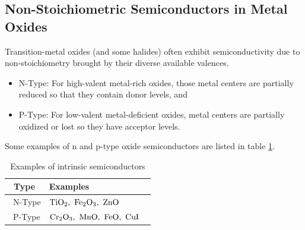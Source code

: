 \subsection{Non-Stoichiometric Semiconductors in Metal Oxides}
%
Transition-metal oxides (and some halides) often exhibit semiconductivity 
due to non-stoichiometry brought by their diverse available valences.
%
\begin{itemize}
    \item N-Type: For high-valent metal-rich oxides, those metal centers are partially reduced so that they contain donor levels, and
    \item P-Type: For low-valent metal-deficient oxides, metal centers are partially oxidized or lost so they have acceptor levels.
\end{itemize}
%
Some examples of n and p-type oxide semiconductors are listed in table \ref{semi}.
%
\begin{table}
	\centering
	\begin{tabular}{@{}ll@{}}
		\toprule
		\ \textbf{Type}		&	\textbf{Examples}					\ \\
		\midrule
		\ N-Type			&	$\rm TiO_2,\ Fe_2O_3,\ ZnO$	\ \\
		\ P-Type			&	$\rm Cr_2O_3,\ MnO,\ FeO,\ CuI$		\ \\
		\bottomrule
	\end{tabular}
	\caption{Examples of intrinsic semiconductors}
	\label{semi}
\end{table}


